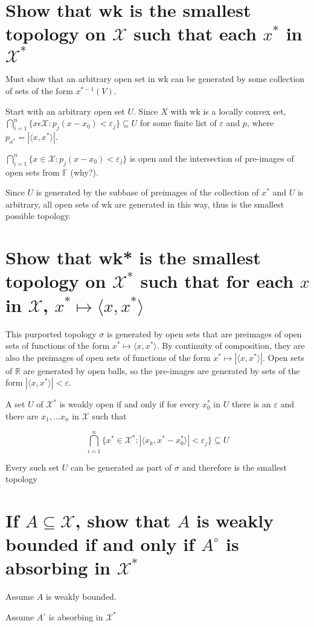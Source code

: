 \documentclass{article}
\begin{document}
\section{Show that wk is the smallest topology on $\mathscr{X}$ such that each $x^*$ in $\mathscr{X}^*$}

Must show that an arbitrary open set in wk can be generated by some collection of sets of the form $x^{*-1}(V)$.

Start with an arbitrary open set $U$. Since $X$ with wk is a locally convex set, $\bigcap^n_{i=1}\{x\epsilon \mathscr{X} : p_j( x-x_0) < \varepsilon_j\} \subseteq U$ for some finite list of $\varepsilon$ and $p$, where $p_{x^*}=|\langle x,x^*\rangle|$.

 $\bigcap^n_{i=1}\{x\in \mathscr{X} : p_j( x-x_0) < \varepsilon_j\}$ is open and the intersection of pre-images of open sets from $\mathbb{F}$ (why?).

Since $U$ is generated by the subbase of preimages of the collection of $x^*$ and $U$ is arbitrary, all open sets of wk are generated in this way, thus is the smallest possible topology.

\section{Show that wk* is the smallest topology on $\mathscr{X}^*$ such that for each $x$ in $\mathscr{X}$, $x^* \mapsto \langle x, x^* \rangle$}


This purported topology $\sigma$ is generated by open sets that are preimages of open sets of functions of the form $x^* \mapsto \langle x, x^* \rangle$. By continuity of composition, they are also the preimages of open sets of functions of the form $x^* \mapsto | \langle x, x^* \rangle | $. Open sets of $\mathbb{R}$ are generated by open balls, so the pre-images are generated by sets of the form $| \langle x, x^* \rangle | < \varepsilon $.

A set $U$ of $\mathscr{X}^*$ is weakly open if and only if for every $x^*_0$ in $U$ there is an $\varepsilon$ and there are $x_1, ... x_n$ in $\mathscr{X}$ such that 

$$\bigcap^n_{i=1}\{x^*\in \mathscr{X}^* : |\langle x_k, x^* - x^*_0 \rangle| < \varepsilon_j\} \subseteq U$$

Every such set $U$ can be generated as part of $\sigma$ and therefore is the smallest topology 


\section{If $A\subseteq\mathscr{X}$, show that $A$ is weakly bounded if and only if $A^{\circ}$ is absorbing in $\mathscr{X}^*$}

Assume $A$ is weakly bounded. 

Assume $A^{\circ}$ is absorbing in $\mathscr{X}^*$
\end{document}
